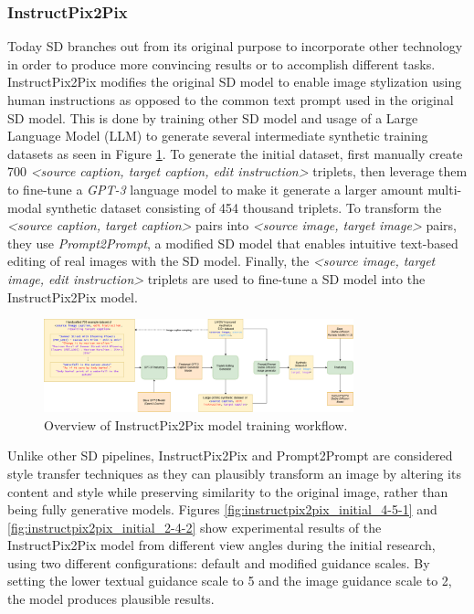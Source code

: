 \subsubsection{InstructPix2Pix}
Today SD branches out from its original purpose to incorporate other technology in order to produce more convincing results or to accomplish different tasks. InstructPix2Pix  modifies the original SD model to enable image stylization using human instructions as opposed to the common text prompt used in the original SD model. This is done by training other SD model and usage of a Large Language Model (LLM) to generate several intermediate synthetic training datasets as seen in Figure \ref{fig:instructpix2pix}. To generate the initial dataset, \Textcite{Brooks.2023} first manually create 700 \textit{<source caption, target caption, edit instruction>} triplets, then leverage them to fine-tune a \textit{GPT-3} language model to make it generate a larger amount multi-modal synthetic dataset consisting of 454 thousand triplets. To transform the \textit{<source caption, target caption>} pairs into \textit{<source image, target image>} pairs, they use \textit{Prompt2Prompt}, a modified SD model  that enables intuitive text-based editing of real images with the SD model.
Finally, the \textit{<source image, target image, edit instruction>} triplets are used to fine-tune a SD model into the InstructPix2Pix model.
\begin{figure}[h]
    \centering
    \includegraphics[width=0.8\textwidth]{Figures/prelim_related/instructpix2pix_training.png}
    \caption{Overview of InstructPix2Pix model training workflow.}
    \label{fig:instructpix2pix}
\end{figure}

Unlike other SD pipelines, InstructPix2Pix and Prompt2Prompt are considered style transfer techniques as they can plausibly transform an image by altering its content and style while preserving similarity to the original image, rather than being fully generative models. Figures \ref{fig:instructpix2pix_initial_4-5-1} and \ref{fig:instructpix2pix_initial_2-4-2} show experimental results of the InstructPix2Pix model from different view angles during the initial research, using two different configurations: default and modified guidance scales. By setting the lower textual guidance scale to 5 and the image guidance scale to 2, the model produces plausible results.

